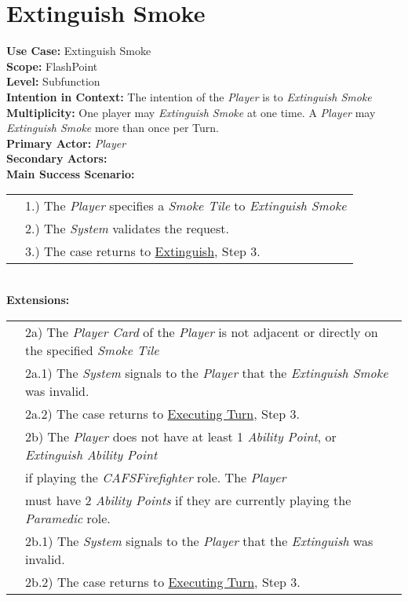 \documentclass{article}
\begin{document}
	\section*{Extinguish Smoke}
	\textbf{Use Case:} Extinguish Smoke\\
	\textbf{Scope:} FlashPoint\\
	\textbf{Level:} Subfunction\\
	\textbf{Intention in Context:} The intention of the \textit{Player} is to \textit{Extinguish Smoke} \\
	\textbf{Multiplicity: } One player may \textit{Extinguish Smoke} at one time. A \textit{Player} may \textit{Extinguish Smoke} more than once per Turn.\\
	\textbf{Primary Actor:} \textit{Player}\\
	\textbf{Secondary Actors:}\\
	\textbf{Main Success Scenario:}\\
	\begin{tabular}{l l}
		&1.) The \textit{Player} specifies a \textit{Smoke Tile} to \textit{Extinguish Smoke}\\
		&2.) The \textit{System} validates the request.\\
		&3.) The case returns to \underline{Extinguish}, Step 3.\\
	\end{tabular}\\
	\textbf{Extensions:}\\
	\begin{tabular}{l l}
		&2a) The \textit{Player Card} of the \textit{Player} is not adjacent or directly on the specified \textit{Smoke Tile} \\
		&\qquad 2a.1) The \textit{System} signals to the \textit{Player} that the \textit{Extinguish Smoke} was invalid.\\ 
		&\qquad 2a.2) The case returns to \underline{Executing Turn}, Step 3.\\
		&2b) The \textit{Player} does not have at least 1 \textit{Ability Point}, or \textit{Extinguish Ability Point}\\
		&\qquad if playing the \textit{CAFSFirefighter} role. The \textit{Player}\\
		&\qquad must have 2 \textit{Ability Points} if they are currently playing the \textit{Paramedic} role.\\
		&\qquad 2b.1) The \textit{System} signals to the \textit{Player} that the \textit{Extinguish} was invalid.\\ 
		&\qquad 2b.2) The case returns to \underline{Executing Turn}, Step 3.\\
	\end{tabular}
	
\end{document}
